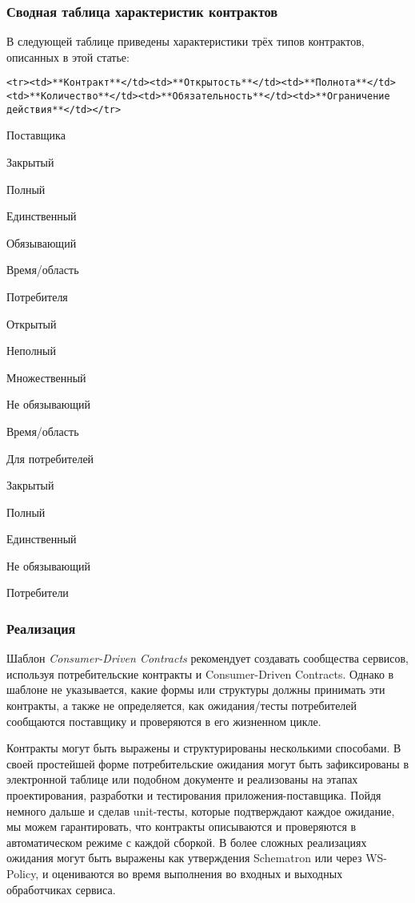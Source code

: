 \documentclass[11pt]{article}
\begin{document}
\subsubsection{Сводная таблица характеристик
контрактов}\label{ux441ux432ux43eux434ux43dux430ux44f-ux442ux430ux431ux43bux438ux446ux430-ux445ux430ux440ux430ux43aux442ux435ux440ux438ux441ux442ux438ux43a-ux43aux43eux43dux442ux440ux430ux43aux442ux43eux432}

В следующей таблице приведены характеристики трёх типов контрактов,
описанных в этой статье:

\begin{verbatim}
<tr><td>**Контракт**</td><td>**Открытость**</td><td>**Полнота**</td><td>**Количество**</td><td>**Обязательность**</td><td>**Ограничение действия**</td></tr>
\end{verbatim}

Поставщика

Закрытый

Полный

Единственный

Обязывающий

Время/область

Потребителя

Открытый

Неполный

Множественный

Не обязывающий

Время/область

Для потребителей

Закрытый

Полный

Единственный

Не обязывающий

Потребители

\subsubsection{Реализация}\label{ux440ux435ux430ux43bux438ux437ux430ux446ux438ux44f}

Шаблон \emph{Consumer-Driven Contracts} рекомендует создавать сообщества
сервисов, используя потребительские контракты и Consumer-Driven
Contracts. Однако в шаблоне не указывается, какие формы или структуры
должны принимать эти контракты, а также не определяется, как
ожидания/тесты потребителей сообщаются поставщику и проверяются в его
жизненном цикле.

Контракты могут быть выражены и структурированы несколькими способами. В
своей простейшей форме потребительские ожидания могут быть зафиксированы
в электронной таблице или подобном документе и реализованы на этапах
проектирования, разработки и тестирования приложения-поставщика. Пойдя
немного дальше и сделав unit-тесты, которые подтверждают каждое
ожидание, мы можем гарантировать, что контракты описываются и
проверяются в автоматическом режиме с каждой сборкой. В более сложных
реализациях ожидания могут быть выражены как утверждения Schematron или
через WS-Policy, и оцениваются во время выполнения во входных и выходных
обработчиках сервиса.
\end{document}
